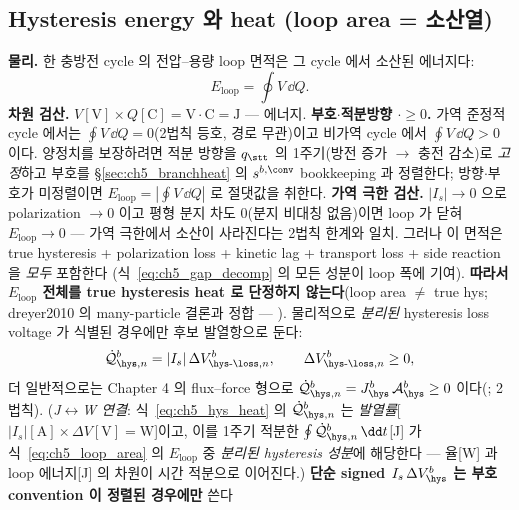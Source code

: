 \subsection{Hysteresis energy 와 heat (loop area = 소산열)}\label{sec:ch5_hysheat}
\textbf{물리.} 한 충방전 cycle 의 전압--용량 loop 면적은 그 cycle 에서 소산된 에너지다:
\begin{equation}
E_{\mathrm{loop}}=\oint V\,\dd Q.
\label{eq:ch5_loop_area}
\end{equation}
\textbf{차원 검산.} $V[\mathrm V]\times Q[\mathrm C]=\mathrm{V\cdot C}=\mathrm J$ — 에너지. \textbf{부호$\cdot$적분방향
$\cdot$$\ge0$.} 가역 준정적 cycle 에서는 $\oint V\,\dd Q=0$(2법칙 등호, 경로 무관)이고 비가역 cycle 에서 $\oint
V\,\dd Q>0$ 이다. 양정치를 보장하려면 적분 방향을 $q_\stt$ 의 1주기(방전 증가 $\to$ 충전 감소)로 \emph{고정}하고
부호를 \S\ref{sec:ch5_branchheat} 의 $s^{b,\conv}$ bookkeeping 과 정렬한다; 방향$\cdot$부호가 미정렬이면
$E_{\mathrm{loop}}=|\oint V\,\dd Q|$ 로 절댓값을 취한다. \textbf{가역 극한 검산.} $|I_s|\to0$ 으로 polarization
$\to0$ 이고 평형 분지 차도 0(분지 비대칭 없음)이면 loop 가 닫혀 $E_{\mathrm{loop}}\to0$ — 가역 극한에서 소산이
사라진다는 2법칙 한계와 일치. 그러나 이 면적은
true hysteresis + polarization loss + kinetic lag + transport loss + side reaction 을 \emph{모두} 포함한다
(식~\eqref{eq:ch5_gap_decomp} 의 모든 성분이 loop 폭에 기여). \textbf{따라서 $E_{\mathrm{loop}}$ 전체를 true
hysteresis heat 로 단정하지 않는다}(loop area $\ne$ true hys; dreyer2010 의 many-particle 결론과 정합 —
). 물리적으로 \emph{분리된} hysteresis loss voltage 가 식별된 경우에만 후보 발열항으로 둔다:
\begin{equation}
\dot{\mathcal Q}_{\hys,n}^b=|I_s|\,\Delta V_{\hys\text{-}\loss,n}^b,\qquad \Delta V_{\hys\text{-}\loss,n}^b\ge0,
\label{eq:ch5_hys_heat}
\end{equation}
더 일반적으로는 Chapter 4 의 flux--force 형으로 $\dot{\mathcal Q}_{\hys,n}^b=J_\hys^b\,\mathcal A_\hys^b\ge0$
이다(; 2법칙). (\emph{J$\leftrightarrow$W 연결}: 식~\eqref{eq:ch5_hys_heat} 의 $\dot{\mathcal Q}_{\hys,n}^b$
는 \emph{발열률}[$|I_s|[\mathrm A]\times\Delta V[\mathrm V]=\mathrm W$]이고, 이를 1주기 적분한 $\oint\dot{\mathcal Q}_{\hys,n}^b\,\dd t$[J]
가 식~\eqref{eq:ch5_loop_area} 의 $E_{\mathrm{loop}}$ 중 \emph{분리된 hysteresis 성분}에 해당한다 — 율[W] 과
loop 에너지[J] 의 차원이 시간 적분으로 이어진다.) \textbf{단순 signed $I_s\,\Delta V_\hys^b$ 는 부호 convention 이 정렬된 경우에만} 쓴다
